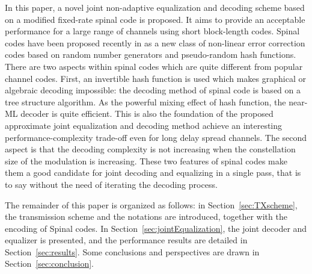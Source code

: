 \documentclass[conference]{IEEEtran}
\begin{document}
In this paper, a novel joint non-adaptive equalization and decoding scheme based on a modified fixed-rate spinal code is proposed. It aims to provide an acceptable performance for a large range of channels using short block-length codes.  
Spinal codes have been proposed recently in \cite{perry2012spinal} as a new class of non-linear error correction codes based on
random number generators and  pseudo-random hash functions.
There are two aspects within spinal codes which are quite different from popular channel codes. First, an invertible hash function is used which makes graphical or algebraic decoding impossible: the decoding method of spinal code is based on a tree structure algorithm. As the powerful mixing effect of hash function, the near-ML decoder is quite efficient. This is also the foundation of the proposed approximate joint equalization and decoding method achieve an interesting performance-complexity trade-off even for long delay spread channels.  
The second aspect is that the decoding complexity is not increasing when the constellation size of the modulation is increasing. These two features of spinal codes make them a good candidate for joint decoding and equalizing in a single pass, that is to say without the need of iterating the decoding process.

The remainder of this paper is organized as follows: in Section~\ref{sec:TXscheme}, the transmission scheme and the notations are introduced, together with the encoding of Spinal codes. In Section~\ref{sec:jointEqualization}, the joint decoder and equalizer is presented, and the performance results are detailed in Section~\ref{sec:results}. Some conclusions and perspectives are drawn in Section~\ref{sec:conclusion}. 
\end{document}

